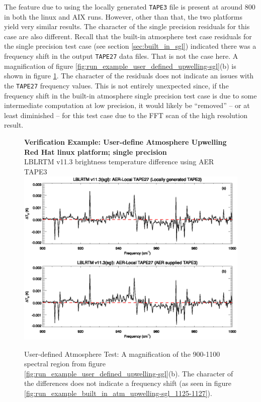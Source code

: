 The feature due to using the locally generated \texttt{TAPE3} file is present at around 800\invcm{} in both the linux and AIX runs. However, other than that, the two platforms yield very similar results. The character of the single precision residuals for this case are also different. Recall that the built-in atmosphere test case residuals for the single precision test case (see section \ref{sec:built_in_sgl}) indicated there was a frequency shift in the output \texttt{TAPE27} data files. That is not the case here. A magnification of figure \ref{fig:run_example_user_defined_upwelling-sgl}(b) is shown in figure \ref{fig:run_example_user_defined_upwelling-sgl_900-1000}. The character of the residuals does not indicate an issues with the \texttt{TAPE27} frequency values. This is not entirely unexpected since, if the frequency shift in the built-in atmosphere single precision test case is due to some intermediate computation at low precision, it would likely be ``removed'' -- or at least diminished -- for this test case due to the FFT scan of the high resolution result.

\begin{figure}[htp]
  \centering
  \qquad\sffamily\textbf{Verification Example: User-define Atmosphere Upwelling}\\
  \qquad\sffamily\textbf{Red Hat linux platform; single precision}\\
  \qquad\textsf{LBLRTM v11.3 brightness temperature difference using AER TAPE3}
  \includegraphics[bb=80 226 534 381,clip,scale=1.0]{graphics/run_example_user_defined_upwelling/sgl_900-1000.eps}
  \caption{User-defined Atmosphere Test: A magnification of the 900-1100\invcm{} spectral region from figure \ref{fig:run_example_user_defined_upwelling-sgl}(b). The character of the differences does not indicate a frequency shift (as seen in figure \ref{fig:run_example_built_in_atm_upwelling-sgl_1125-1127}).}
  \label{fig:run_example_user_defined_upwelling-sgl_900-1000}
\end{figure}
